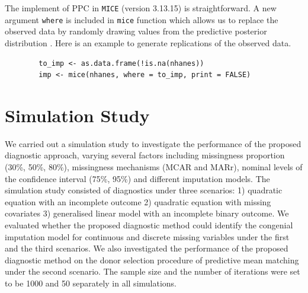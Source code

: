 	The implement of PPC in \texttt{MICE} (version 3.13.15) is straightforward. A new argument \texttt{where} is included in \texttt{mice} function which allows us to replace the observed data by randomly drawing values from the predictive posterior distribution \citep{volker2021anonymiced}. Here is an example to generate replications of the observed data.   
	\begin{lstlisting}
		to_imp <- as.data.frame(!is.na(nhanes)) 
		imp <- mice(nhanes, where = to_imp, print = FALSE)
	\end{lstlisting}


	\section{Simulation Study}
	\label{sec:6.4}
	We carried out a simulation study to investigate the performance of the proposed diagnostic approach, varying several factors including missingness proportion (30\%, 50\%, 80\%), missingness mechanisms (MCAR and MARr), nominal levels of the confidence interval (75\%, 95\%) and different imputation models. The simulation study consisted of diagnostics under three scenarios: 1) quadratic equation with an incomplete outcome 2) quadratic equation with missing covariates 3) generalised linear model with an incomplete binary outcome. We evaluated whether the proposed diagnostic method could identify the congenial imputation model for continuous and discrete missing variables under the first and the third scenarios. We also investigated the performance of the proposed diagnostic method on the donor selection procedure of predictive mean matching under the second scenario. The sample size and the number of iterations were set to be 1000 and 50 separately in all simulations.  
	
